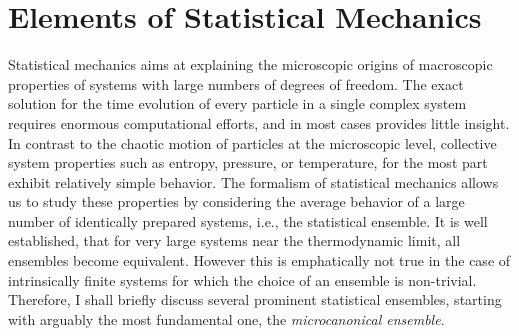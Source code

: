 \documentclass[12pt]{report}
\begin{document}
\chapter{Elements of Statistical Mechanics}
\label{chap:elements_of_stat_mech}
Statistical mechanics aims at explaining the microscopic origins of macroscopic properties of systems with large numbers of degrees of freedom. The exact solution for the time evolution of every particle in a single complex system requires enormous computational efforts, and in most cases provides little insight. In contrast to the chaotic motion of particles at the microscopic level, collective system properties such as entropy, pressure, or temperature, for the most part exhibit relatively simple behavior. The formalism of statistical mechanics allows us to study these properties by considering the average behavior of a large number of identically prepared systems, i.e., the statistical ensemble. It is well established, that for very large systems near the thermodynamic limit, all ensembles become equivalent. However this is emphatically not true in the case of intrinsically finite systems for which the choice of an ensemble is non-trivial\cite{Bachmann2014}. Therefore, I shall briefly discuss several prominent statistical ensembles, starting with arguably the most fundamental one, the \textit{microcanonical ensemble}.
\end{document}
